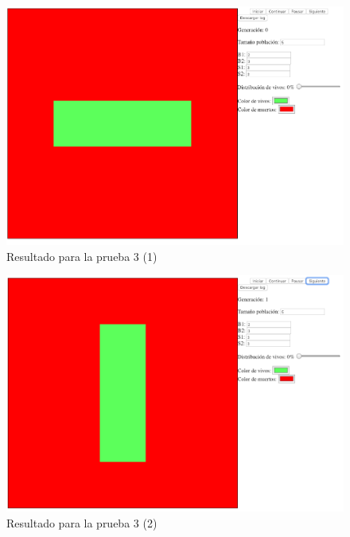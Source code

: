 	\begin{figure}[H]
		\begin{center}
			\includegraphics[scale=.3]{GOL/img/test3-1.png}
			\caption{Resultado para la prueba 3 (1)}
			\label{fig:gol5}
		\end{center}
	\end{figure}

	\begin{figure}[H]
		\begin{center}
			\includegraphics[scale=.3]{GOL/img/test3-2.png}
			\caption{Resultado para la prueba 3 (2)}
			\label{fig:gol4}
		\end{center}
	\end{figure}

